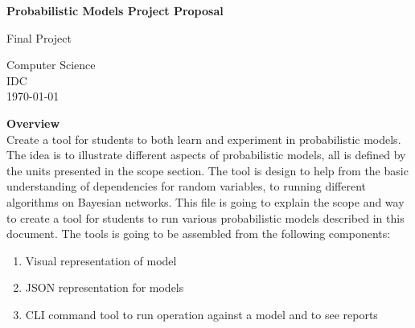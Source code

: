 \documentclass{article}
\begin{document}
    \begin{titlepage}
        \begin{center}
            \vspace*{1cm}
            
            \textbf{Probabilistic Models Project Proposal}
            
            \vspace{0.5cm}
            
            
            \vspace{1.5cm}
            
            \vfill
            
            Final Project\\
            
            \vspace{0.8cm}
            
            
            
            Computer Science\\
            IDC\\
            \today
            
        \end{center}
    \end{titlepage}

    \textbf{Overview}\\
    Create a tool for students to both learn and experiment in probabilistic models. The idea is to illustrate different aspects of probabilistic models, all is defined by the units presented in the scope section.
    The tool is design to help from the basic understanding of dependencies for random variables, to running different algorithms on Bayesian networks.
    This file is going to explain the scope and way to create a tool for students to run various probabilistic models described in this document. The tools is going to be assembled from the following components:
    \begin{enumerate}
        \item Visual representation of model
        \item JSON representation for models
        \item CLI command tool to run operation against a model and to see reports
    \end{enumerate}
\end{document}
